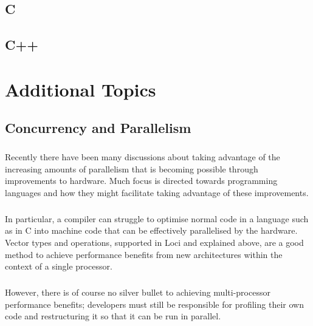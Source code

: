 \documentclass[12pt,twoside,notitlepage]{report}
\begin{document}
\section{C}

\paragraph{}


\section{C++}

\paragraph{}


\cleardoublepage

\chapter{Additional Topics}

\section{Concurrency and Parallelism}

\paragraph{}
Recently there have been many discussions about taking advantage of the increasing amounts of parallelism that is becoming possible through improvements to hardware. Much focus is directed towards programming languages and how they might facilitate taking advantage of these improvements.

\paragraph{}
In particular, a compiler can struggle to optimise normal code in a language such as in C into machine code that can be effectively parallelised by the hardware. Vector types and operations, supported in Loci and explained above, are a good method to achieve performance benefits from new architectures within the context of a single processor.

\paragraph{}
However, there is of course no silver bullet to achieving multi-processor performance benefits; developers must still be responsible for profiling their own code and restructuring it so that it can be run in parallel.
\end{document}
